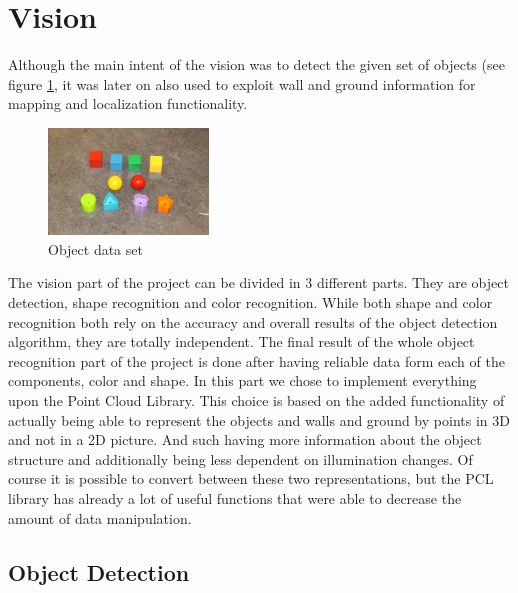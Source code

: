 \section{Vision}

Although the main intent of the vision was to detect the given set of objects (see figure \ref{fig:object_set},
it was later on also used to exploit wall and ground information for mapping and localization functionality.

\begin{figure}
\begin{center}
\includegraphics[width=0.38\textwidth]{figures/object_dataset}
\end{center}
\caption{Object data set}
\label{fig:object_set}
\end{figure}

The vision part of the project can be divided in 3 different parts.
They are object detection, shape recognition and color recognition.
While both shape and color recognition both rely on the accuracy and overall results of the object detection algorithm, they are totally independent. 
The final result of the whole object recognition part of the project is done after having reliable data form each of the components, color and shape.
In this part we chose to implement everything upon the Point Cloud Library. 
This choice is based on the added functionality of actually being able to represent the objects and walls and ground by points in 3D and not in a 2D picture. 
And such having more information about the object structure and additionally being less dependent on illumination changes.
Of course it is possible to convert between these two representations, but the PCL library has already a lot of useful functions that were able to decrease the amount of data manipulation.

\subsection{Object Detection}

